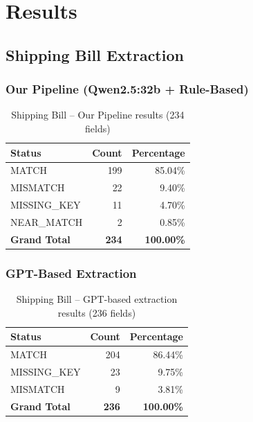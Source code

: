 \documentclass[12pt,a4paper]{report}
\begin{document}
\chapter{Results}

\section{Shipping Bill Extraction}

\subsection{Our Pipeline (Qwen2.5:32b + Rule-Based)}
\begin{table}[H]
\centering\sffamily
\begin{tabular}{l r r}
\toprule
\textbf{Status} & \textbf{Count} & \textbf{Percentage} \\
\midrule
\rowcolor{matchgreen} MATCH & 199 & 85.04\% \\
\rowcolor{misyellow} MISMATCH & 22 & 9.40\% \\
\rowcolor{missred!60} MISSING\_KEY & 11 & 4.70\% \\
\rowcolor{nearorange} NEAR\_MATCH & 2 & 0.85\% \\
\midrule
\textbf{Grand Total} & \textbf{234} & \textbf{100.00\%} \\
\bottomrule
\end{tabular}
\caption{Shipping Bill -- Our Pipeline results (234 fields)}
\end{table}

\subsection{GPT-Based Extraction}
\begin{table}[H]
\centering\sffamily
\begin{tabular}{l r r}
\toprule
\textbf{Status} & \textbf{Count} & \textbf{Percentage} \\
\midrule
\rowcolor{matchgreen} MATCH & 204 & 86.44\% \\
\rowcolor{missred!60} MISSING\_KEY & 23 & 9.75\% \\
\rowcolor{misyellow} MISMATCH & 9 & 3.81\% \\
\midrule
\textbf{Grand Total} & \textbf{236} & \textbf{100.00\%} \\
\bottomrule
\end{tabular}
\caption{Shipping Bill -- GPT-based extraction results (236 fields)}
\end{table}
\end{document}
